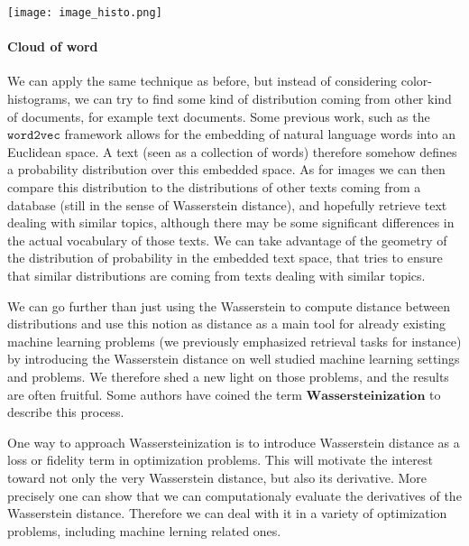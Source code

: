 \begin{center}
	\texttt{[image: image\_histo.png]}
\end{center}


\paragraph{Cloud of word}

We can apply the same technique as before, but instead of considering
color-histograms, we can try to find some kind of distribution coming from
other kind of documents, for example text documents. Some previous work,
such as the $\texttt{word2vec}$ framework allows for the embedding of
natural language words into an Euclidean space. A text (seen as a collection
of words) therefore somehow defines a probability distribution over this
embedded space. As for images we can then compare this distribution to
the distributions of other texts coming from a database (still in the
sense of Wasserstein distance), and hopefully retrieve text dealing with
similar topics, although there may be some significant differences in the
actual vocabulary of those texts. We can take advantage of the geometry of the
distribution of probability in the embedded text space, that tries to ensure
that similar distributions are coming from texts dealing with similar topics.


We can go further than just using the Wasserstein to compute distance between
distributions and use this notion as distance as a main tool for already
existing machine learning problems (we previously emphasized retrieval
tasks for instance) by introducing the Wasserstein distance on well studied
machine learning settings and problems. We therefore shed a new light on those
problems, and the results are often fruitful. Some authors have coined the
term $\textbf{Wassersteinization}$ to describe this process.


One way to approach Wassersteinization is to introduce Wasserstein distance
as a loss or fidelity term in optimization problems. This will motivate
the interest toward not only the very Wasserstein distance, but also its
derivative. More precisely one can show that we can computationaly evaluate
the derivatives of the Wasserstein distance. Therefore we can deal with it
in a variety of optimization problems, including machine lerning related ones.

